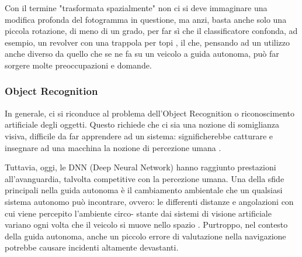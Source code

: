 \documentclass[14pt]{extarticle}
\begin{document}
Con il termine "trasformata spazialmente" non ci si deve immaginare
una modifica profonda del fotogramma in questione, ma anzi, basta
anche solo una piccola rotazione, di meno di un grado, per far sì che il
classificatore confonda, ad esempio, un revolver con una trappola per topi
\cite{engstrom2019exploring}, il che, pensando ad un utilizzo anche diverso da quello che se ne fa
su un veicolo a guida autonoma, può far sorgere molte preoccupazioni e
domande.%

\subsubsection{Object Recognition}
In generale, ci si riconduce al problema dell’Object Recognition o riconoscimento artificiale degli oggetti. Questo richiede che ci sia una nozione
di somiglianza visiva, difficile da far apprendere ad un sistema: significherebbe catturare e insegnare ad una macchina la nozione di percezione
umana \cite{engstrom2019exploring}.

Tuttavia, oggi, le DNN (Deep Neural Network) hanno raggiunto prestazioni all’avanguardia, talvolta competitive con la percezione umana.
Una della sfide principali nella guida autonoma è il cambiamento ambientale che un qualsiasi sistema autonomo può incontrare, ovvero: le
differenti distanze e angolazioni con cui viene percepito l’ambiente circo-
stante dai sistemi di visione artificiale variano ogni volta che il veicolo si
muove nello spazio \cite{eykholt2018robust} .
Purtroppo, nel contesto della guida autonoma, anche un piccolo errore
di valutazione nella navigazione potrebbe causare incidenti altamente
devastanti.

\end{document}
